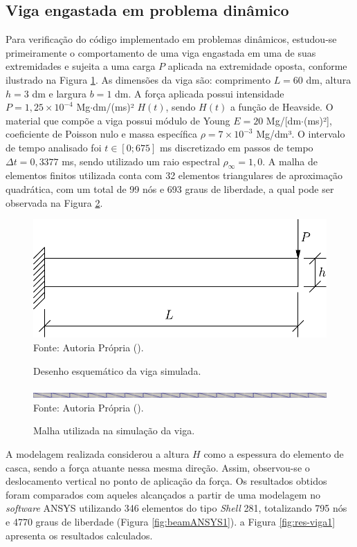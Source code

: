 \subsection{Viga engastada em problema dinâmico} \label{Ap:DinBeam}

Para verificação do código implementado em problemas dinâmicos, estudou-se  primeiramente o comportamento de uma viga engastada em uma de suas extremidades e sujeita a uma carga $P$ aplicada na extremidade oposta, conforme ilustrado na Figura \ref{fig:viga1}. As dimensões da viga são: comprimento $L=60$ dm, altura $h=3$ dm e largura $b=1$ dm. A força aplicada possui intensidade $P=1,25\times10^{-4}$ Mg$\cdot$dm/(ms)² $H(t)$, sendo $H(t)$ a função de Heavside. O material que compõe a viga possui módulo de Young $E=20$ Mg/[dm$\cdot$(ms)²], coeficiente de Poisson nulo e massa específica $\rho=7\times10^{-3}$ Mg/dm³. O intervalo de tempo analisado foi $t\in[0;675]$ ms discretizado em passos de tempo $\Delta t=0,3377$ ms, sendo utilizado um raio espectral $\rho_\infty=1,0$. A malha de elementos finitos utilizada conta com 32 elementos triangulares de aproximação quadrática, com um total de 99 nós e 693 graus de liberdade, a qual pode ser observada na Figura \ref{fig:viga1-mesh}.

\begin{figure}[h!]
    \centering
    \caption{Desenho esquemático da viga simulada.}
    \includegraphics[width=0.5\linewidth]{Figuras/vigas/viga1.pdf}
    \\Fonte: Autoria Própria (\the\year).
    \label{fig:viga1}
\end{figure}

\begin{figure}[h!]
    \centering
    \caption{Malha utilizada na simulação da viga.}
    \includegraphics[width=\linewidth]{Figuras/vigas/mesh1.png}
    \\Fonte: Autoria Própria (\the\year).
    \label{fig:viga1-mesh}
\end{figure}

A modelagem realizada considerou a altura $H$ como a espessura do elemento de casca, sendo a força atuante nessa mesma direção. Assim, observou-se o deslocamento vertical no ponto de aplicação da força. Os resultados obtidos foram comparados com aqueles alcançados a partir de uma modelagem no \textit{software} ANSYS utilizando 346 elementos do tipo \textit{Shell} 281, totalizando 795 nós e 4770 graus de liberdade (Figura \ref{fig:beamANSYS1}). a Figura \ref{fig:res-viga1} apresenta os resultados calculados.

